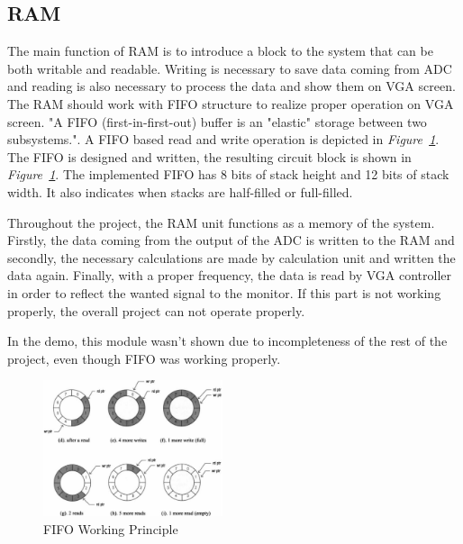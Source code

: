 \documentclass[paper]{IEEEtran}
\begin{document}
	\subsection{RAM} \- \indent
	The main function of RAM is to introduce a block to the system that can be both writable and readable. Writing is necessary to save data coming from ADC and reading is also necessary to process the data and show them on VGA screen. The RAM should work with FIFO structure to realize proper operation on VGA screen. "A FIFO (first-in-first-out) buffer is an "elastic" storage between two subsystems."\cite{b3}. A FIFO based read and write operation is depicted in \textit{Figure~\ref{fig:fifo_diagram}}. The FIFO is designed and written, the resulting circuit block is shown in \textit{Figure~\ref{fig:fifo_diagram}}. The implemented FIFO has 8 bits of stack height and 12 bits of stack width. It also indicates when stacks are half-filled or full-filled.
	
	Throughout the project, the RAM unit functions as a memory of the system. Firstly, the data coming from the output of the ADC is written to the RAM and secondly, the necessary calculations are made by calculation unit and written the data again. Finally, with a proper frequency, the data is read by VGA controller in order to reflect the wanted signal to the monitor. If this part is not working properly, the overall project can not operate properly. 
	
	In the demo, this module wasn't shown due to incompleteness of the rest of the project, even though FIFO was working properly.
	
	\begin{figure}[t!]
		\setlength{\unitlength}{\textwidth}
		\center 
		\includegraphics[width=0.47\textwidth]{fifo_diagram}
		\caption{\label{fig:fifo_diagram}FIFO Working Principle\cite{b3}}
	\end{figure}
	
\end{document}
